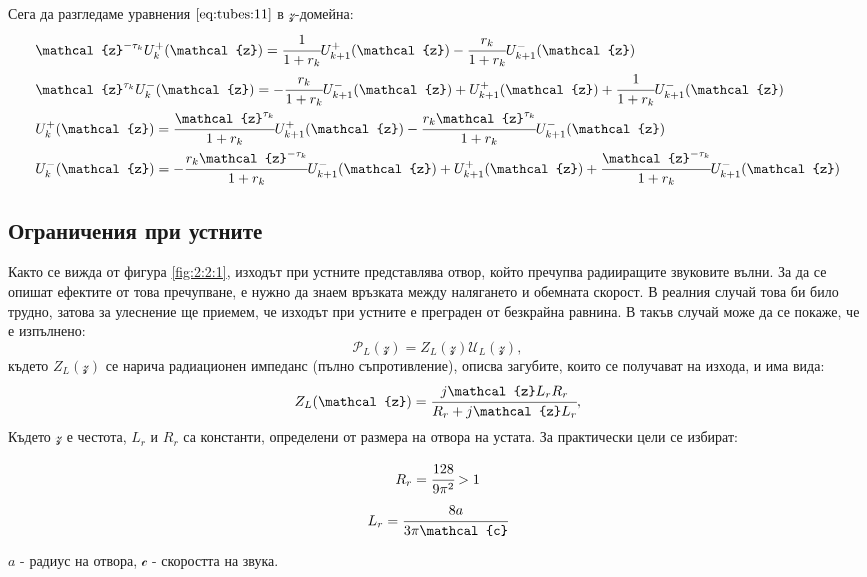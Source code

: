 \documentclass[12pt]{report}
\numberwithin{equation}{section}
\numberwithin{figure}{section}
\begin{document}
    Сега да разгледаме уравнения $\eqref{eq:tubes:11}$ в $\mathcal{z}$-домейна:
    \begin{subequations}
        \label{eq:tubes:12}
        \begin{align}
            & \nonumber \mathcal{z}^{-\tau_k}U_k^{+}(\mathcal{z}) = \cfrac{1}{1 + r_k} U_{k+1}^{+}(\mathcal{z}) - \cfrac{r_k}{1+r_k} U_{k+1}^{-}(\mathcal{z}) \\
            & \nonumber \mathcal{z}^{\tau_k} U_k^{-}(\mathcal{z}) = - \cfrac{r_k}{1+r_k} U_{k+1}^{-}(\mathcal{z}) + U_{k+1}^{+}(\mathcal{z}) + \cfrac{1}{1 + r_k} U_{k+1}^{-}(\mathcal{z}) \\
            & U_k^{+}(\mathcal{z}) = \cfrac{\mathcal{z}^{\tau_k}}{1 + r_k} U_{k+1}^{+}(\mathcal{z}) - \cfrac{r_k\mathcal{z}^{\tau_k}}{1+r_k} U_{k+1}^{-}(\mathcal{z})\\
            & U_k^{-}(\mathcal{z}) = - \cfrac{r_k\mathcal{z}^{-\tau_k} }{1+r_k} U_{k+1}^{-}(\mathcal{z}) + U_{k+1}^{+}(\mathcal{z}) + \cfrac{\mathcal{z}^{-\tau_k} }{1 + r_k} U_{k+1}^{-}(\mathcal{z})
        \end{align}
    \end{subequations}

    \subsection{Ограничения при устните}
    Както се вижда от фигура \autoref{fig:2:2:1}, изходът при устните представлява отвор, който
    пречупва радииращите звуковите вълни.
    За да се опишат ефектите от това пречупване, е нужно да знаем връзката между
    налягането и обемната скорост. В реалния случай това би било трудно, затова за улеснение
    ще приемем, че изходът при устните е преграден от безкрайна равнина. В такъв случай може
    да се покаже, че е изпълнено:
    \begin{equation}
        \label{eq:tubes:13}
        \mathcal{P}_L(\mathcal{z}) = Z_L(\mathcal{z}) \mathcal{U}_L(\mathcal{z}),
    \end{equation}
    където 
    $Z_L(\mathcal{z})$ се нарича радиационен импеданс (пълно съпротивление), описва загубите, които се получават на изхода, и има вида:
    \[
        Z_L(\mathcal{z}) = \cfrac{j\mathcal{z} L_r R_r}{R_r + j\mathcal{z} L_r},    
    \]
    Където $\mathcal{z}$ е честота, $L_r$ и $R_r$ са константи, определени от размера на отвора на устата. За практически цели се избират:

    \begin{multicols}{2}
        \begin{equation*}
          R_r = \cfrac{128}{9\pi^2} > 1
        \end{equation*}\break
        \begin{equation*}
          L_r = \cfrac{8a}{3\pi \mathcal{c}}
        \end{equation*}
      \end{multicols}
    $a$ - радиус на отвора, $\mathcal{c}$ - скоростта на звука.
\end{document}
